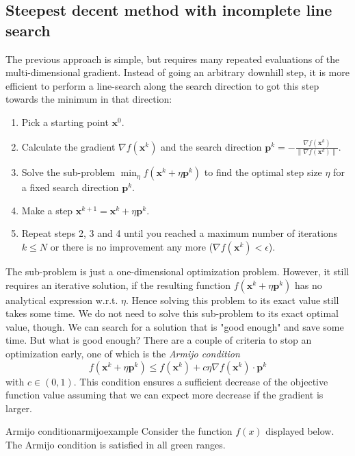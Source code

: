 \subsection{Steepest decent method with incomplete line search}
The previous approach is simple, but requires many repeated evaluations of the multi-dimensional gradient. Instead of going an arbitrary downhill step, it is more efficient to perform a line-search along the search direction to got this step towards the minimum in that direction: 
\begin{enumerate}
    \item Pick a starting point $\mathbf{x}^0$.
    \item Calculate the gradient $\nabla f(\mathbf{x}^k)$ and the search direction $\mathbf{p}^k = - \frac{\nabla f(\mathbf{x}^k)}{\lVert \nabla f(\mathbf{x}^k) \rVert}$.
    \item Solve the sub-problem $\min_{\eta} f(\mathbf{x}^k + \eta \mathbf{p}^k)$ to find the optimal step size $\eta$ for a fixed search direction $\mathbf{p}^k$.
    \item Make a step $\mathbf{x}^{k+1} = \mathbf{x}^k + \eta \mathbf{p}^k$.
    \item Repeat steps 2, 3 and 4 until you reached a maximum number of iterations $k \le N$ or there is no improvement any more ($ \nabla f(\mathbf{x}^k) < \epsilon$). 
\end{enumerate}

The sub-problem is just a one-dimensional optimization problem. However, it still requires an iterative solution, if the resulting function $f(\mathbf{x}^k + \eta \mathbf{p}^k)$ has no analytical expression w.r.t. $\eta$. Hence solving this problem to its exact value still takes some time. We do not need to solve this sub-problem to its exact optimal value, though. We can search for a solution that is "good enough" and save some time. But what is good enough?
There are a couple of criteria to stop an optimization early, one of which is the \emph{Armijo condition} 
\begin{equation}
    f(\mathbf{x}^k + \eta \mathbf{p}^k) \le f(\mathbf{x}^k) + c \eta  \nabla f(\mathbf{x}^k) \cdot \mathbf{p}^k 
\end{equation}
with $c \in (0,1)$. This condition ensures a sufficient decrease of the objective function value assuming that we can expect more decrease if the gradient is larger. 

\begin{example}{Armijo condition}{armijoexample}
    Consider the function $f(x)$ displayed below. The Armijo condition is satisfied in all green ranges.  
    
    
\end{example}

